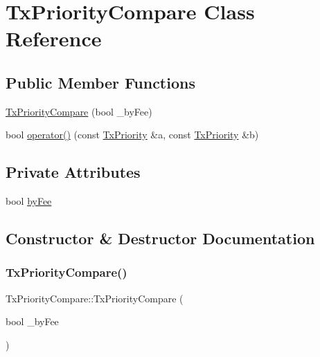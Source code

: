 \hypertarget{class_tx_priority_compare}{}\section{Tx\+Priority\+Compare Class Reference}
\label{class_tx_priority_compare}
\subsection*{Public Member Functions}
\begin{DoxyCompactItemize}
\item 
\mbox{\hyperlink{class_tx_priority_compare_a2ee1aac9d165bbeaaf2a687373f318ad}{Tx\+Priority\+Compare}} (bool \+\_\+by\+Fee)
\item 
bool \mbox{\hyperlink{class_tx_priority_compare_ab50fdbeb5862709d13a271c11ade1775}{operator()}} (const \mbox{\hyperlink{miner_8cpp_a978fa41d50b6f9b1ee69c34d243ea1c7}{Tx\+Priority}} \&a, const \mbox{\hyperlink{miner_8cpp_a978fa41d50b6f9b1ee69c34d243ea1c7}{Tx\+Priority}} \&b)
\end{DoxyCompactItemize}
\subsection*{Private Attributes}
\begin{DoxyCompactItemize}
\item 
bool \mbox{\hyperlink{class_tx_priority_compare_af1131beb8df18cfff0376939902cc6de}{by\+Fee}}
\end{DoxyCompactItemize}


\subsection{Constructor \& Destructor Documentation}
\mbox{\label{class_tx_priority_compare_a2ee1aac9d165bbeaaf2a687373f318ad}} 
\subsubsection{\texorpdfstring{Tx\+Priority\+Compare()}{TxPriorityCompare()}}
{\footnotesize\ttfamily Tx\+Priority\+Compare\+::\+Tx\+Priority\+Compare (\begin{DoxyParamCaption}\item[{bool}]{\+\_\+by\+Fee }\end{DoxyParamCaption})\hspace{0.3cm}{\ttfamily [inline]}}



